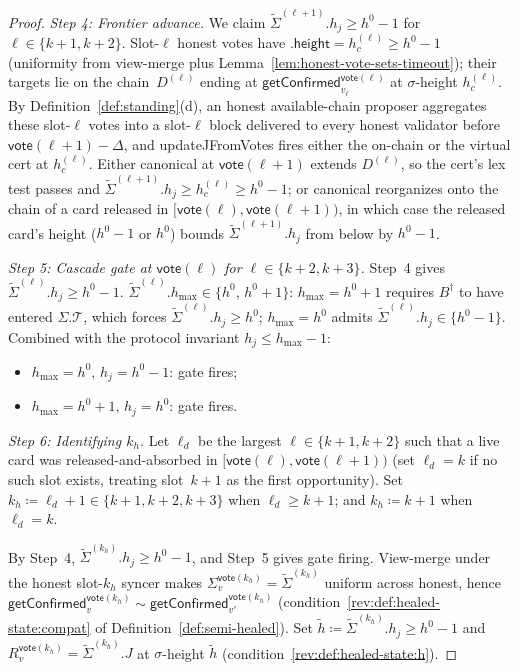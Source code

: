 \ifx\litemode\undefined\documentclass{article}\fi
\newcommand{\T}[0]{\ensuremath{\mathcal{T}}}
\newcommand{\height}{\mathsf{height}}
\newcommand{\hmax}{\ensuremath{h_{\max}}\xspace}
\newcommand{\updateJFromVotes}{\textsf{updateJFromVotes}\xspace}
\newcommand{\vote}{\ensuremath{\mathsf{vote}}}
\newcommand{\comm}[1]{\ensuremath{\widetilde{#1}}}
\newcommand{\getConfirmed}{\textsf{getConfirmed}\xspace}
\theoremstyle{plain}
\theoremstyle{definition}
\theoremstyle{remark}
\begin{document}
\begin{proof}
\emph{Step 4: Frontier advance.}
We claim $\comm{\Sigma}^{(\ell+1)}.h_j \geq h^0 - 1$ for $\ell \in \{k+1, k+2\}$.
Slot-$\ell$ honest votes have $.\height = h_c^{(\ell)} \geq h^0 - 1$ (uniformity from view-merge plus Lemma~\ref{lem:honest-vote-sets-timeout}); their targets lie on the chain~$D^{(\ell)}$ ending at $\getConfirmed_{v_\ell}^{\vote(\ell)}$ at $\sigma$-height $h_c^{(\ell)}$.
By Definition~\ref{def:standing}(d), an honest available-chain proposer aggregates these slot-$\ell$ votes into a slot-$\ell$ block delivered to every honest validator before $\vote(\ell+1) - \Delta$, and \updateJFromVotes{} fires either the on-chain or the virtual cert at $h_c^{(\ell)}$.
Either canonical at $\vote(\ell+1)$ extends $D^{(\ell)}$, so the cert's lex test passes and $\comm{\Sigma}^{(\ell+1)}.h_j \geq h_c^{(\ell)} \geq h^0 - 1$; or canonical reorganizes onto the chain of a card released in $[\vote(\ell), \vote(\ell+1))$, in which case the released card's height ($h^0 - 1$ or $h^0$) bounds $\comm{\Sigma}^{(\ell+1)}.h_j$ from below by $h^0 - 1$.

\emph{Step 5: Cascade gate at $\vote(\ell)$ for $\ell \in \{k+2, k+3\}$.}
Step~4 gives $\comm{\Sigma}^{(\ell)}.h_j \geq h^0 - 1$.
$\comm{\Sigma}^{(\ell)}.\hmax \in \{h^0,\, h^0 + 1\}$: $\hmax = h^0 + 1$ requires $B^\dagger$ to have entered $\Sigma.\T$, which forces $\comm{\Sigma}^{(\ell)}.h_j \geq h^0$; $\hmax = h^0$ admits $\comm{\Sigma}^{(\ell)}.h_j \in \{h^0 - 1\}$.
Combined with the protocol invariant $h_j \leq \hmax - 1$:
\begin{itemize}
  \item $\hmax = h^0,\, h_j = h^0 - 1$: gate fires;
  \item $\hmax = h^0 + 1,\, h_j = h^0$: gate fires.
\end{itemize}

\emph{Step 6: Identifying $k_h$.}
Let $\ell_d$ be the largest $\ell \in \{k+1, k+2\}$ such that a live card was released-and-absorbed in $[\vote(\ell), \vote(\ell+1))$ (set $\ell_d = k$ if no such slot exists, treating slot~$k+1$ as the first opportunity).
Set $k_h \coloneqq \ell_d + 1 \in \{k+1, k+2, k+3\}$ when $\ell_d \geq k+1$; and $k_h \coloneqq k+1$ when $\ell_d = k$.

By Step~4, $\comm{\Sigma}^{(k_h)}.h_j \geq h^0 - 1$, and Step~5 gives gate firing.
View-merge under the honest slot-$k_h$ syncer makes $\Sigma_v^{\vote(k_h)} = \comm{\Sigma}^{(k_h)}$ uniform across honest, hence $\getConfirmed_v^{\vote(k_h)} \sim \getConfirmed_{v'}^{\vote(k_h)}$ (condition~\ref{rev:def:healed-state:compat} of Definition~\ref{def:semi-healed}).
Set $\comm{h} \coloneqq \comm{\Sigma}^{(k_h)}.h_j \geq h^0 - 1$ and $R_v^{\vote(k_h)} = \comm{\Sigma}^{(k_h)}.J$ at $\sigma$-height $\comm{h}$ (condition~\ref{rev:def:healed-state:h}).


\end{proof}
\end{document}
